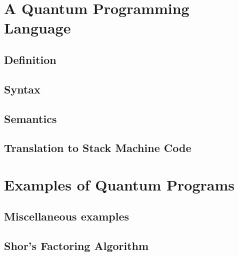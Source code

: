 \documentclass[12pt]{report}
\begin{document}
\chapter{A Quantum Programming Language}
\section{Definition}
\section{Syntax}
\section{Semantics}
\section{Translation to Stack Machine Code}
\chapter{Examples of Quantum Programs}
\section{Miscellaneous examples}
\section{Shor's Factoring Algorithm}





\end{document}
